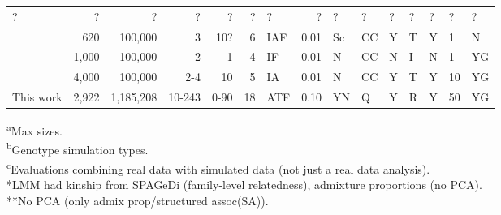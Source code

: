 \documentclass[11pt]{article}
\begin{document}
\begin{table}[hb!]
\begin{tabular}{lrrrrrlrlllllll}
    ?                                &     ? &         ? &      ? &    ? &    ? &   ? &    ? &    ? &  ? &   ? &   ? &   ? &   ? &   ? \\
    \cite{thornton_roadtrips:_2010}  &   620 &   100,000 &      3 &  10? &    6 & IAF & 0.01 &   Sc & CC &   Y &   T &   Y &   1 &   N \\
    \cite{price_new_2010}            & 1,000 &   100,000 &      2 &    1 &    4 &  IF & 0.01 &    N & CC &   N &   I &   N &   1 &  YG \\
    \cite{wu_comparison_2011}        & 4,000 &   100,000 &    2-4 &   10 &    5 &  IA & 0.01 &    N & CC &   Y &   T &   Y &  10 &  YG \\
    This work                        & 2,922 & 1,185,208 & 10-243 & 0-90 &   18 & ATF & 0.10 &   YN &  Q &   Y &   R &   Y &  50 &  YG \\
    \bottomrule
  \end{tabular}
  \begin{flushleft} 
    \textsuperscript{a}Max sizes.\\
    \textsuperscript{b}Genotype simulation types.\\
    \textsuperscript{c}Evaluations combining real data with simulated data (not just a real data analysis).\\
    *LMM had kinship from SPAGeDi (family-level relatedness), admixture proportions (no PCA).\\
    **No PCA (only admix prop/structured assoc(SA)).
  \end{flushleft}
\end{table}


\end{document}
